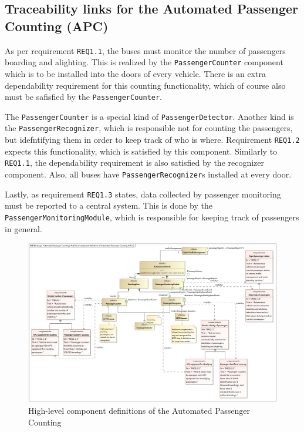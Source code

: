 \documentclass[a4paper]{article}
\begin{document}
\subsection{Traceability links for the Automated Passenger Counting (APC)}%
\label{subsec:apc}

As per requirement \texttt{REQ1.1}, the buses must monitor the number of
passengers boarding and alighting. This is realized by the
\texttt{PassengerCounter} component which is to be installed into the doors of
every vehicle. There is an extra dependability requirement for this counting
functionality, which of course also must be safisfied by the
\texttt{PassengerCounter}.

\sloppy
The \texttt{PassengerCounter} is a special kind of \texttt{PassengerDetector}.
Another kind is the \texttt{PassengerRecognizer}, which is responsible not for
counting the passengers, but idefntifying them in order to keep track of who is
where. Requirement \texttt{REQ1.2} expects this functionality, which is
satisfied by this component. Similarly to \texttt{REQ1.1}, the dependability
requirement is also satisfied by the recognizer component. Also, all buses have
\texttt{PassengerRecognizer}s installed at every door.

Lastly, as requirement \texttt{REQ1.3} states, data collected by passenger
monitoring must be reported to a central system. This is done by the
\texttt{PassengerMonitoringModule}, which is responsible for keeping track of
passengers in general.

\begin{figure}
	\centering
	\includegraphics[width=\textwidth]{bdd-apc.jpg}
	\caption{High-level component definitions of the Automated Passenger
		Counting}%
	\label{fig:bdd-apc}
\end{figure}
\end{document}
